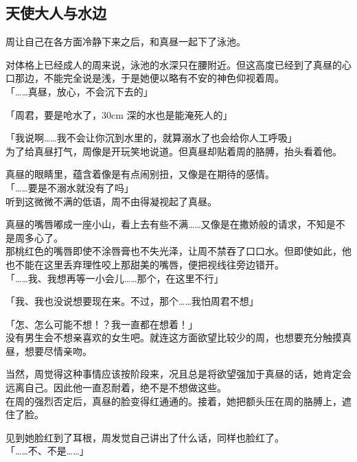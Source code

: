 \subsection{天使大人与水边}

周让自己在各方面冷静下来之后，和真昼一起下了泳池。

对体格上已经成人的周来说，泳池的水深只在腰附近。但这高度已经到了真昼的心口那边，不能完全说是浅，于是她便以略有不安的神色仰视着周。\\

「……真昼，放心，不会沉下去的」

「周君，要是呛水了，30cm 深的水也是能淹死人的」

「我说啊……我不会让你沉到水里的，就算溺水了也会给你人工呼吸」\\

为了给真昼打气，周像是开玩笑地说道。但真昼却贴着周的胳膊，抬头看着他。

真昼的眼睛里，蕴含着像是有点闹别扭，又像是在期待的感情。\\

「……要是不溺水就没有了吗」\\

听到这微微不满的低语，周不由得凝视起了真昼。

真昼的嘴唇嘟成一座小山，看上去有些不满……又像是在撒娇般的请求，不知是不是周多心了。\\

那桃红色的嘴唇即使不涂唇膏也不失光泽，让周不禁吞了口口水。但即使如此，他也不能在这里丢弃理性咬上那甜美的嘴唇，便把视线往旁边错开。\\

「……我、我想再等一小会儿……那个，在这里不行」

「我、我也没说想要现在来。不过，那个……我怕周君不想」

「怎、怎么可能不想！？我一直都在想着！」\\

没有男生会不想亲喜欢的女生吧。就连这方面欲望比较少的周，也想要充分触摸真昼，想要尽情亲吻。

当然，周觉得这种事情应该按阶段来，况且总是将欲望强加于真昼的话，她肯定会远离自己。因此他一直忍耐着，绝不是不想做这些。\\

在周的强烈否定后，真昼的脸变得红通通的。接着，她把额头压在周的胳膊上，遮住了脸。

见到她脸红到了耳根，周发觉自己讲出了什么话，同样也脸红了。\\

「……不、不是……」

